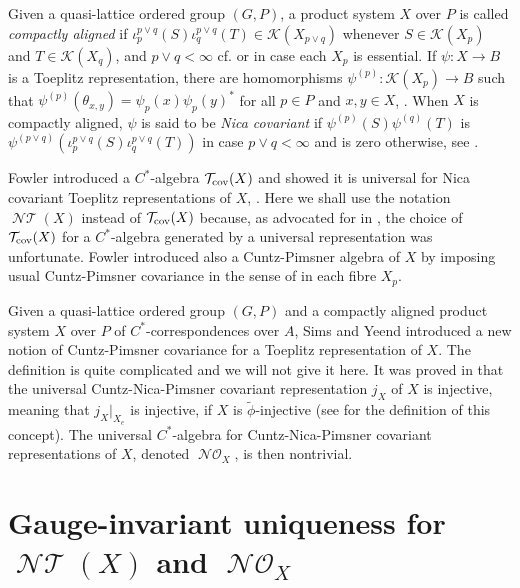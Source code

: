 \documentclass[12pt]{amsart}
\theoremstyle{plain}
\theoremstyle{remark}
\theoremstyle{definition}
\numberwithin{equation}{section}
\theoremstyle{plain}
\theoremstyle{definition}
\theoremstyle{remark}
\begin{document}
Given a quasi-lattice ordered group $(G,P)$, a product system
$X$ over $P$ is called \emph{compactly aligned} if $\iota^{p \vee q}_p(S) \iota^{p
\vee q}_q(T) \in {\mathcal K}(X_{p\vee q})$ whenever $S \in {\mathcal K}(X_p)$
and $T \in {\mathcal K}(X_q)$, and $p \vee q < \infty$ cf. \cite{CLSV} or \cite[Definition 5.7]{F}
in case each $X_p$ is essential.
If $\psi:X\to B$ is a Toeplitz representation,  there are
homomorphisms $\psi^{(p)}:{\mathcal K}(X_p)\to B$ such that $\psi^{(p)}(\theta_{x,y})=\psi_p(x)\psi_p(y)^*$ for all
$p\in P$ and $x,y\in X$, \cite{P}. When $X$ is compactly aligned, $\psi$ is said to be \emph{Nica covariant} if $\psi^{(p)}(S)\psi^{(q)}(T)$
is $\psi^{(p\vee q)}(\iota^{p \vee q}_p(S) \iota^{p\vee q}_q(T))$ in case $p\vee q<\infty$ and is zero otherwise, see \cite{F}.

Fowler introduced a $C^*$-algebra ${{\mathcal T}_{\rm cov}}(X)$ and showed it is universal for Nica covariant Toeplitz
representations of $X$, \cite{F}. Here we shall use the notation ${\operatorname{\mathcal{NT}}}(X)$ instead of ${{\mathcal T}_{\rm cov}}(X)$
because, as advocated for in  \cite[Remark 5.3]{BanHLR}, the choice of
 ${{\mathcal T}_{\rm cov}}(X)$ for a $C^*$-algebra generated by a
universal representation was unfortunate. Fowler introduced also a Cuntz-Pimsner algebra of $X$
 by imposing usual Cuntz-Pimsner covariance in the sense of \cite{P} in each fibre $X_p$.

 Given a quasi-lattice ordered group $(G,P)$ and a compactly aligned product system $X$
over $P$ of $C^*$-correspondences over $A$, Sims and Yeend \cite{SY} introduced a new notion of Cuntz-Pimsner covariance
 for a Toeplitz representation of $X$. The definition is quite complicated and we will not give it here. It was
proved in \cite[Theorem 4.1]{SY} that the universal Cuntz-Nica-Pimsner covariant representation $j_X$ of $X$ is
injective, meaning that $j_X\vert_{X_e}$ is injective, if $X$ is $\tilde\phi$-injective
(see \cite[\S 2.4]{CLSV} for the definition of this concept). The universal $C^*$-algebra for
Cuntz-Nica-Pimsner covariant representations of $X$, denoted ${\operatorname{\mathcal{NO}}_{\!{X}}}$, is then nontrivial.

\section{Gauge-invariant uniqueness  for ${\operatorname{\mathcal{NT}}}(X)$ and ${\operatorname{\mathcal{NO}}_{\!{X}}}$}
\label{NO}
\end{document}

